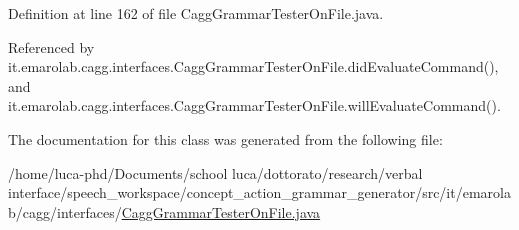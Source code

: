 Definition at line 162 of file Cagg\-Grammar\-Tester\-On\-File.\-java.



Referenced by it.\-emarolab.\-cagg.\-interfaces.\-Cagg\-Grammar\-Tester\-On\-File.\-did\-Evaluate\-Command(), and it.\-emarolab.\-cagg.\-interfaces.\-Cagg\-Grammar\-Tester\-On\-File.\-will\-Evaluate\-Command().



The documentation for this class was generated from the following file\-:\begin{DoxyCompactItemize}
\item 
/home/luca-\/phd/\-Documents/school luca/dottorato/research/verbal interface/speech\-\_\-workspace/concept\-\_\-action\-\_\-grammar\-\_\-generator/src/it/emarolab/cagg/interfaces/\hyperlink{CaggGrammarTesterOnFile_8java}{Cagg\-Grammar\-Tester\-On\-File.\-java}\end{DoxyCompactItemize}
